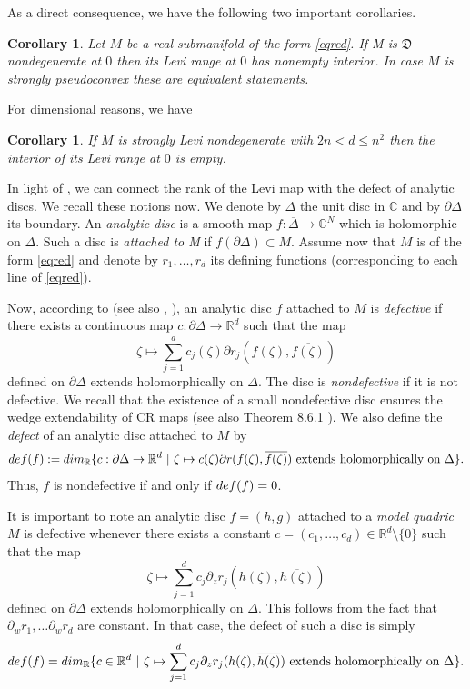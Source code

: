 \documentclass[10pt,a4paper]{amsart}
\newcommand{\C}{\mathbb C}
\newcommand{\R}{\mathbb R}
\newtheorem{cor}[theo]{Corollary}
\numberwithin{equation}{section}
\begin{document}
As a direct consequence, we have the following two important corollaries. 
\begin{cor}
Let  $M$ be a   real submanifold of the form \eqref{eqred}. If M is $\mathfrak{D}$-nondegenerate at $0$  then its Levi range at $0$ has nonempty interior. In case $M$ is strongly pseudoconvex these are equivalent statements.
\end{cor}

For dimensional reasons, we have
\begin{cor}
If $M$ is strongly Levi nondegenerate with $2n<d\leq n^2$ then  the interior of its Levi range at $0$ is empty.
\end{cor}




In light of \cite{be-me}, we can  connect the rank of the Levi map with the defect of analytic discs. We recall these notions now. We denote by $
\Delta$ the unit disc in $\C$ and by $\partial \Delta$ its boundary. An {\it analytic disc} is a smooth map $f: \overline{\Delta} \to \C^N$ which is holomorphic on $\Delta$. Such a disc is {\it attached to M} if $f(\partial \Delta) \subset M$. Assume now that $M$ is of the form \eqref{eqred} and denote by $r_1,\ldots,r_d$ its  defining functions (corresponding to each line of  \eqref{eqred}). 

Now, according to \cite{tu0} (see also \cite{ba-ro-tr}, \cite{ber}), an analytic disc $f$ attached to $M$ is {\it defective} if there exists a continuous 
map 
$c: \partial \Delta \to \R^{d}$ such that the map 
$$\zeta \mapsto \sum_{j=1}^d c_j(\zeta) \partial r_j(f(\zeta),\overline{f(\zeta)})$$
defined on $\partial \Delta$ extends holomorphically on $\Delta$. The disc is  {\it nondefective} if it is not defective. We recall that the existence of a small nondefective disc ensures the wedge extendability of CR maps  \cite{tu0} (see also Theorem 8.6.1 \cite{ber}).   
We also define the {\it defect} of an analytic  disc attached to $M$ by
$${\rm def}(f):={\rm dim}_\R \{c:\partial \Delta \to \R^d \ | \ \zeta \mapsto c(\zeta)\partial r(f(\zeta),\overline{f(\zeta)}) \mbox{ extends holomorphically on } \Delta\}.$$
Thus, $f$ is nondefective if and only if  ${\rm def}(f)=0$. 

It is important to note an analytic disc $f=(h,g)$ attached to a {\it model quadric} $M$ is defective whenever there exists a constant $c=(c_1,\ldots,c_d) \in \R^d\setminus\{0\}$ such that the map 
$$\zeta \mapsto  \sum_{j=1}^d c_j \partial_z r_j(h(\zeta),\overline{h(\zeta)})$$
defined on $\partial \Delta$ extends holomorphically on $\Delta$. This  follows from the fact that 
$\partial_w r_1,\ldots \partial_w r_d$ are constant. In that case, the defect of such a  disc is simply 
$${\rm def}(f)={\rm dim}_\R \{c \in \R^d \ | \ \zeta \mapsto  \sum_{j=1}^d c_j \partial_z r_j(h(\zeta),\overline{h(\zeta)}) \mbox{ extends holomorphically on } \Delta\}.$$
\end{document}
